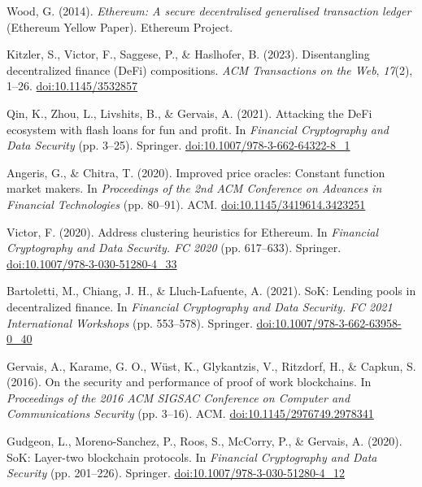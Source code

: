 \begin{enumerate}[label={[\arabic*]}, leftmargin=*, itemsep=0.35em, parsep=0pt]
  \item{}\label{ref:36} Wood, G. (2014). \textit{Ethereum: A secure decentralised generalised transaction ledger} (Ethereum Yellow Paper). Ethereum Project.
  \item{}\label{ref:37} Kitzler, S., Victor, F., Saggese, P., \& Haslhofer, B. (2023). Disentangling decentralized finance (DeFi) compositions. \textit{ACM Transactions on the Web}, \textit{17}(2), 1--26. \href{https://doi.org/10.1145/3532857}{doi:10.1145/3532857}
  \item{}\label{ref:38} Qin, K., Zhou, L., Livshits, B., \& Gervais, A. (2021). Attacking the DeFi ecosystem with flash loans for fun and profit. In \textit{Financial Cryptography and Data Security} (pp. 3--25). Springer. \href{https://doi.org/10.1007/978-3-662-64322-8_1}{doi:10.1007/978-3-662-64322-8\_1}
  \item{}\label{ref:39} Angeris, G., \& Chitra, T. (2020). Improved price oracles: Constant function market makers. In \textit{Proceedings of the 2nd ACM Conference on Advances in Financial Technologies} (pp. 80--91). ACM. \href{https://doi.org/10.1145/3419614.3423251}{doi:10.1145/3419614.3423251}
  \item{}\label{ref:40} Victor, F. (2020). Address clustering heuristics for Ethereum. In \textit{Financial Cryptography and Data Security. FC 2020} (pp. 617--633). Springer. \href{https://doi.org/10.1007/978-3-030-51280-4_33}{doi:10.1007/978-3-030-51280-4\_33}
  \item{}\label{ref:41} Bartoletti, M., Chiang, J. H., \& Lluch-Lafuente, A. (2021). SoK: Lending pools in decentralized finance. In \textit{Financial Cryptography and Data Security. FC 2021 International Workshops} (pp. 553--578). Springer. \href{https://doi.org/10.1007/978-3-662-63958-0_40}{doi:10.1007/978-3-662-63958-0\_40}
  \item{}\label{ref:42} Gervais, A., Karame, G. O., W\"{u}st, K., Glykantzis, V., Ritzdorf, H., \& Capkun, S. (2016). On the security and performance of proof of work blockchains. In \textit{Proceedings of the 2016 ACM SIGSAC Conference on Computer and Communications Security} (pp. 3--16). ACM. \href{https://doi.org/10.1145/2976749.2978341}{doi:10.1145/2976749.2978341}
  \item{}\label{ref:43} Gudgeon, L., Moreno-Sanchez, P., Roos, S., McCorry, P., \& Gervais, A. (2020). SoK: Layer-two blockchain protocols. In \textit{Financial Cryptography and Data Security} (pp. 201--226). Springer. \href{https://doi.org/10.1007/978-3-030-51280-4_12}{doi:10.1007/978-3-030-51280-4\_12}

\end{enumerate}
